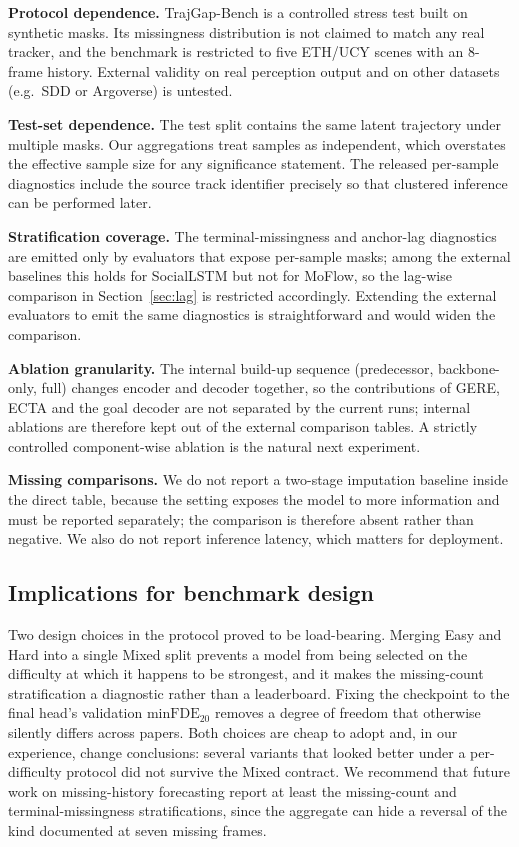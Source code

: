 \textbf{Protocol dependence.} TrajGap-Bench is a controlled stress test built on synthetic masks. Its missingness distribution is not claimed to match any real tracker, and the benchmark is restricted to five ETH/UCY scenes with an 8-frame history. External validity on real perception output and on other datasets (e.g.\ SDD or Argoverse) is untested.

\textbf{Test-set dependence.} The test split contains the same latent trajectory under multiple masks. Our aggregations treat samples as independent, which overstates the effective sample size for any significance statement. The released per-sample diagnostics include the source track identifier precisely so that clustered inference can be performed later.

\textbf{Stratification coverage.} The terminal-missingness and anchor-lag diagnostics are emitted only by evaluators that expose per-sample masks; among the external baselines this holds for SocialLSTM but not for MoFlow, so the lag-wise comparison in Section~\ref{sec:lag} is restricted accordingly. Extending the external evaluators to emit the same diagnostics is straightforward and would widen the comparison.

\textbf{Ablation granularity.} The internal build-up sequence (predecessor, backbone-only, full) changes encoder and decoder together, so the contributions of GERE, ECTA and the goal decoder are not separated by the current runs; internal ablations are therefore kept out of the external comparison tables. A strictly controlled component-wise ablation is the natural next experiment.

\textbf{Missing comparisons.} We do not report a two-stage imputation baseline inside the direct table, because the setting exposes the model to more information and must be reported separately; the comparison is therefore absent rather than negative. We also do not report inference latency, which matters for deployment.

\subsection{Implications for benchmark design}
Two design choices in the protocol proved to be load-bearing. Merging Easy and Hard into a single Mixed split prevents a model from being selected on the difficulty at which it happens to be strongest, and it makes the missing-count stratification a diagnostic rather than a leaderboard. Fixing the checkpoint to the final head's validation $\mathrm{minFDE}_{20}$ removes a degree of freedom that otherwise silently differs across papers. Both choices are cheap to adopt and, in our experience, change conclusions: several variants that looked better under a per-difficulty protocol did not survive the Mixed contract. We recommend that future work on missing-history forecasting report at least the missing-count and terminal-missingness stratifications, since the aggregate can hide a reversal of the kind documented at seven missing frames.

